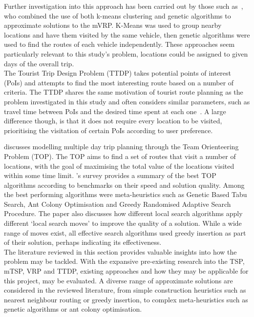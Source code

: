 Further investigation into this approach has been carried out by those such as~\textcite{nallusamy2010optimization}, who
combined the use of both k-means clustering and genetic algorithms to approximate solutions to the mVRP.
K-Means was used to group nearby locations and have them visited by the same vehicle, then genetic algorithms were
used to find the routes of each vehicle independently.
These approaches seem particularly relevant to this study's problem, locations could be assigned to given days of the
overall trip.\\

\noindent
The Tourist Trip Design Problem (TTDP) takes potential points of interest (PoIs) and attempts to find the most
interesting route based on a number of criteria.
The TTDP shares the same motivation of tourist route planning as the problem investigated in this study and often
considers similar parameters, such as travel time between PoIs and the desired time spent at each one~\parencite{vansteenwegen2007mobile}.
A large difference though, is that it does not require every location to be visited, prioritising the visitation of
certain PoIs according to user preference.

\textcite{vansteenwegen2007mobile} discusses modelling multiple day trip planning through the Team Orienteering
Problem (TOP).
The TOP aims to find a set of routes that visit a number of locations, with the goal of maximising the total value of
the locations visited within some time limit.
\textcite{vansteenwegen2011orienteering}'s survey provides a summary of the best TOP algorithms according
to benchmarks on their speed and solution quality.
Among the best performing algorithms were meta-heuristics such as Genetic Based Tabu Search, Ant Colony Optimisation
and Greedy Randomised Adaptive Search Procedure.
The paper also discusses how different local search algorithms apply different `local search moves' to improve the
quality of a solution.
While a wide range of moves exist, all effective search algorithms used greedy insertion as part of their
solution, perhaps indicating its effectiveness.\\

\noindent
The literature reviewed in this section provides valuable insights into how the problem may be tackled.
With the expansive pre-existing research into the TSP, mTSP, VRP and TTDP, existing
approaches and how they may be applicable for this project, may be evaluated.
A diverse range of approximate solutions are considered in the reviewed literature, from simple construction
heuristics such as nearest neighbour routing or greedy insertion, to complex meta-heuristics such as genetic
algorithms or ant colony optimisation.


